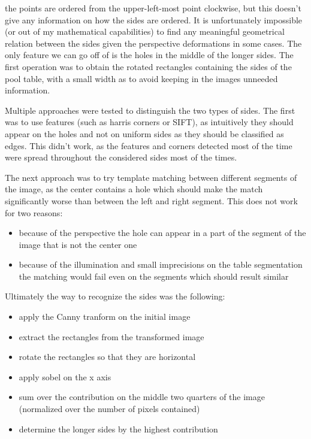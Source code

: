 the points are ordered from the upper-left-most point clockwise, but this doesn't give
any information on how the sides are ordered. It is unfortunately impossible (or out of my
mathematical capabilities) to find any meaningful geometrical relation between the sides
given the perspective deformations in some cases. The only feature we can go off of is the 
holes in the middle of the longer sides. The first operation was to obtain the rotated
rectangles containing the sides of the pool table, with a small width as to avoid 
keeping in the images unneeded information.\par 
Multiple approaches were tested to distinguish the two types of sides. The first was 
to use features (such as harris corners or SIFT), as intuitively they should appear 
on the holes and not on uniform sides as they should be classified as edges. This didn't
work, as the features and corners detected most of the time were spread throughout the 
considered sides most of the times.\par
The next approach was to try template matching between different segments of the image,
as the center contains a hole which should make the match significantly worse than
between the left and right segment. This does not work for two reasons:
\begin{itemize}
    \item because of the perspective the hole can appear in a part of the segment of the image that is not the center one
    \item because of the illumination and small imprecisions on the table segmentation the matching would fail even on the segments which should result similar
\end{itemize}
\par
Ultimately the way to recognize the sides was the following:
\begin{itemize}
    \item apply the Canny tranform on the initial image
    \item extract the rectangles from the transformed image
    \item rotate the rectangles so that they are horizontal
    \item apply sobel on the x axis
    \item sum over the contribution on the middle two quarters of the image (normalized over the number of pixels contained)
    \item determine the longer sides by the highest contribution
\end{itemize}
